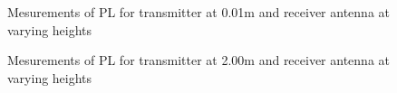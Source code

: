 \begin{figure}[!htbp]
\centering

\caption{Mesurements of PL for transmitter at 0.01m and receiver antenna at varying heights}
\label{Meas2}
\end{figure}

\begin{figure}[H]
\centering

\caption{Mesurements of PL for transmitter at 2.00m and receiver antenna at varying heights}
\label{Meas3}
\end{figure}








     

